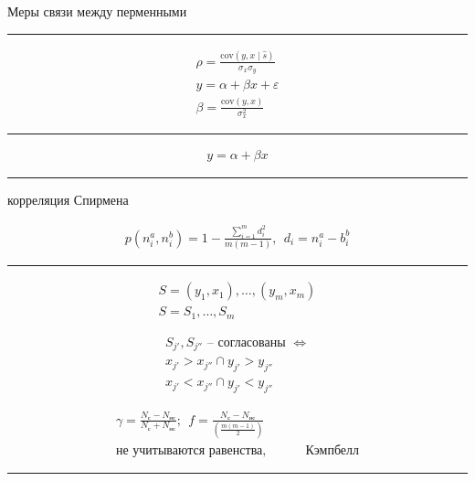 \documentclass{book}
\begin{document}
Меры связи между перменными
\hrule

\begin{gather*}
\rho=\frac{\mathrm{cov}(y,x\mid \hat{s})}{\sigma_x \sigma_y}\\
y=\alpha+\beta x+\varepsilon\\
\beta=\frac{\mathrm{cov}(y,x)}{\sigma_x^2}
\end{gather*}

\hrule

 \begin{gather*}
  y=\alpha+\beta x
\end{gather*}
\hrule

корреляция Спирмена

\begin{gather*}
  p(n_i^a, n_i^b)=1-\frac{\sum_{i=1}^{m} {d_i^2}}{m(m-1)},~~d_i=n_i^a-b_i^{b}
\end{gather*}

\hrule
\begin{gather*}
    S={(y_1,x_1),\dots,(y_m,x_m)}\\
    S={S_1,\dots,S_m}
\end{gather*}

\begin{gather*}
    S_{j'}, S_{j''} \textrm{ -- согласованы } \Leftrightarrow\\
    x_{j'}>x_{j''} \cap y_{j'}>y_{j''}\\
    x_{j'}<x_{j''} \cap y_{j'}<y_{j''}
\end{gather*}

\begin{gather*}
  \gamma = \frac{N_\textrm{с}-N_\textrm{нс}}{N_\textrm{с}+N_\textrm{нс}};~~
  f=\frac{N_\textrm{с}-N_\textrm{нс}}{\left(\frac{m(m-1)}{2}\right)}\\
  \textrm{не учитываются равенства}, ~~~~~~~~~~~~~~\textrm{Кэмпбелл}
\end{gather*}
\hrule
\end{document}
